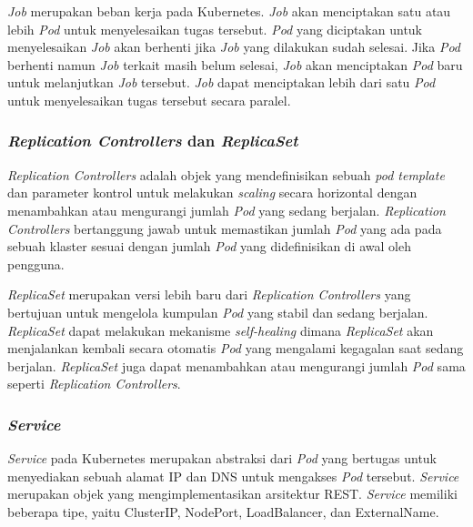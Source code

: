\emph{Job} merupakan beban kerja pada Kubernetes. \emph{Job} akan menciptakan satu atau
lebih \emph{Pod} untuk menyelesaikan tugas tersebut. \emph{Pod} yang diciptakan untuk menyelesaikan
\emph{Job} akan berhenti jika \emph{Job} yang dilakukan sudah selesai. Jika \emph{Pod}
berhenti namun \emph{Job} terkait masih belum selesai, \emph{Job} akan menciptakan \emph{Pod}
baru untuk melanjutkan \emph{Job} tersebut. \emph{Job} dapat menciptakan lebih dari satu
\emph{Pod} untuk menyelesaikan tugas tersebut secara paralel.

\subsubsection{\emph{Replication Controllers} dan \emph{ReplicaSet}}

\emph{Replication Controllers} adalah objek yang mendefinisikan sebuah \emph{pod template}
dan parameter kontrol untuk melakukan \emph{scaling} secara horizontal dengan menambahkan
atau mengurangi jumlah \emph{Pod} yang sedang berjalan. \emph{Replication Controllers}
bertanggung jawab untuk memastikan jumlah \emph{Pod} yang ada pada sebuah klaster
sesuai dengan jumlah \emph{Pod} yang didefinisikan di awal oleh pengguna.

\emph{ReplicaSet} merupakan versi lebih baru dari \emph{Replication Controllers} yang
bertujuan untuk mengelola kumpulan \emph{Pod} yang stabil dan sedang berjalan. \emph{ReplicaSet}
dapat melakukan mekanisme \emph{self-healing} dimana \emph{ReplicaSet} akan menjalankan
kembali secara otomatis \emph{Pod} yang mengalami kegagalan saat sedang berjalan. \emph{ReplicaSet}
juga dapat menambahkan atau mengurangi jumlah \emph{Pod} sama seperti \emph{Replication Controllers}.

\subsubsection{\emph{Service}}

\emph{Service} pada Kubernetes merupakan abstraksi dari \emph{Pod} yang bertugas untuk
menyediakan sebuah alamat IP dan DNS untuk mengakses \emph{Pod} tersebut. \emph{Service}
merupakan objek yang mengimplementasikan arsitektur REST. \emph{Service} memiliki beberapa tipe,
yaitu ClusterIP, NodePort, LoadBalancer, dan ExternalName.

